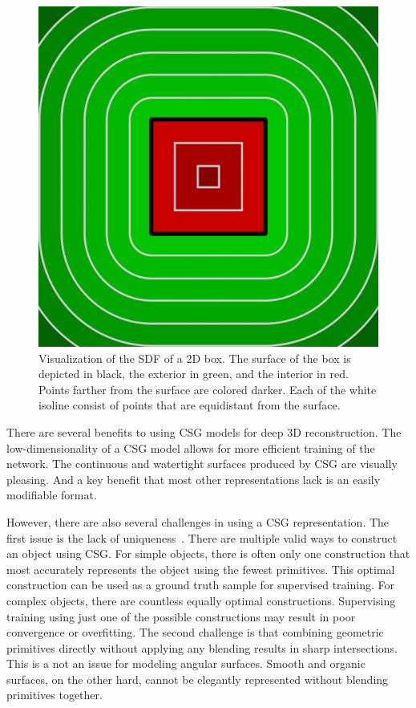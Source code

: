 \begin{figure}
	\centering
	\includegraphics[scale=0.2]{Images/SDF Box}
	\caption{Visualization of the SDF of a 2D box. The surface of the box is depicted in black, the exterior in green, and the interior in red. Points farther from the surface are colored darker. Each of the white isoline consist of points that are equidistant from the surface.}
	\label{fig:sdf_box}
\end{figure}

There are several benefits to using CSG models for deep 3D reconstruction. The low-dimensionality of a CSG model allows for more efficient training of the network. The continuous and watertight surfaces produced by CSG are visually pleasing. And a key benefit that most other representations lack is an easily modifiable format.

However, there are also several challenges in using a CSG representation. The first issue is the lack of uniqueness~\cite{Hughes2013}. There are multiple valid ways to construct an object using CSG. For simple objects, there is often only one construction that most accurately represents the object using the fewest primitives. This optimal construction can be used as a ground truth sample for supervised training. For complex objects, there are countless equally optimal constructions. Supervising training using just one of the possible constructions may result in poor convergence or overfitting. The second challenge is that combining geometric primitives directly without applying any blending results in sharp intersections. This is a not an issue for modeling angular surfaces. Smooth and organic surfaces, on the other hard, cannot be elegantly represented without blending primitives together.

